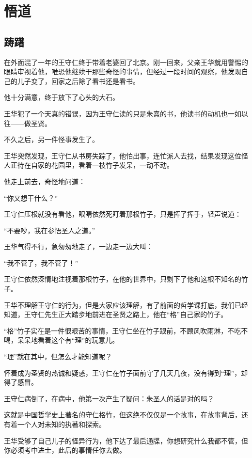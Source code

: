 \section{悟道}
\ifnum{}
	\begin{multicols}{\theparacolNo}
		\fi
		\subsection{踌躇}
		在外面混了一年的王守仁终于带着老婆回了北京。刚一回来，父亲王华就用警惕的眼睛审视着他，唯恐他继续干那些奇怪的事情，但经过一段时间的观察，他发现自己的儿子变了，回家之后除了看书还是看书。

		他十分满意，终于放下了心头的大石。

		王华犯了一个天真的错误，因为王守仁读的只是朱熹的书，他读书的动机也一如以往——做圣贤。

		不久之后，另一件怪事发生了。

		王华突然发现，王守仁从书房失踪了，他怕出事，连忙派人去找，结果发现这位怪人正待在自家的花园里，看着一枝竹子发呆，一动不动。

		他走上前去，奇怪地问道：

		“你又想干什么？”

		王守仁压根就没有看他，眼睛依然死盯着那根竹子，只是挥了挥手，轻声说道：

		“不要吵，我在参悟圣人之道。”

		王华气得不行，急匆匆地走了，一边走一边大叫：

		“我不管了，我不管了！”

		王守仁依然深情地注视着那根竹子，在他的世界中，只剩下了他和这根不知名的竹子。

		王华不理解王守仁的行为，但是大家应该理解，有了前面的哲学课打底，我们已经知道，王守仁先生正大踏步地前进在圣贤之路上，他在“格”自己家的竹子。

		“格”竹子实在是一件很艰苦的事情，王守仁坐在竹子跟前，不顾风吹雨淋，不吃不喝，呆呆地看着这个有“理”的玩意儿。

		“理”就在其中，但怎么才能知道呢？

		怀着成为圣贤的热诚和疑惑，王守仁在竹子面前守了几天几夜，没有得到“理”，却得了感冒。

		王守仁病倒了，在病中，他第一次产生了疑问：朱圣人的话是对的吗？

		这就是中国哲学史上著名的守仁格竹，但这绝不仅仅是一个故事，在故事背后，还有着一个人对未知的执著和探索。

		王华受够了自己儿子的怪异行为，他下达了最后通牒，你想研究什么我都不管，但你必须考中进士，此后的事情任你去做。


\end{multicols}
